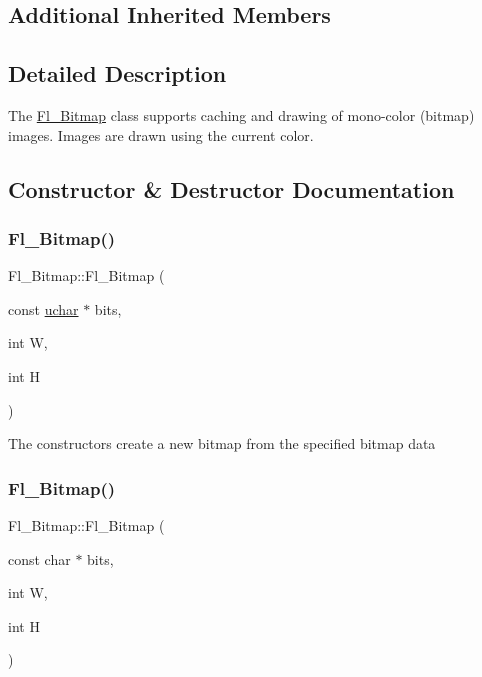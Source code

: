 \subsection*{Additional Inherited Members}


\subsection{Detailed Description}
The \hyperlink{class_fl___bitmap}{Fl\+\_\+\+Bitmap} class supports caching and drawing of mono-\/color (bitmap) images. Images are drawn using the current color. 

\subsection{Constructor \& Destructor Documentation}
\mbox{\label{class_fl___bitmap_abb9d089d289d990de49b9722fbd57241}} 
\subsubsection{\texorpdfstring{Fl\+\_\+\+Bitmap()}{Fl\_Bitmap()}\hspace{0.1cm}{\footnotesize\ttfamily [1/2]}}
{\footnotesize\ttfamily Fl\+\_\+\+Bitmap\+::\+Fl\+\_\+\+Bitmap (\begin{DoxyParamCaption}\item[{const \hyperlink{fl__types_8h_a65f85814a8290f9797005d3b28e7e5fc}{uchar} $\ast$}]{bits,  }\item[{int}]{W,  }\item[{int}]{H }\end{DoxyParamCaption})\hspace{0.3cm}{\ttfamily [inline]}}

The constructors create a new bitmap from the specified bitmap data \mbox{\label{class_fl___bitmap_a5eb102e0ab090a7c547e9349dbe7e943}} 
\subsubsection{\texorpdfstring{Fl\+\_\+\+Bitmap()}{Fl\_Bitmap()}\hspace{0.1cm}{\footnotesize\ttfamily [2/2]}}
{\footnotesize\ttfamily Fl\+\_\+\+Bitmap\+::\+Fl\+\_\+\+Bitmap (\begin{DoxyParamCaption}\item[{const char $\ast$}]{bits,  }\item[{int}]{W,  }\item[{int}]{H }\end{DoxyParamCaption})\hspace{0.3cm}{\ttfamily [inline]}}

